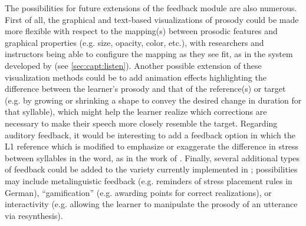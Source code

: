 	The possibilities for future extensions of the feedback module are also numerous. First of all, the graphical and text-based visualizations of prosody could be made more flexible with respect to the mapping(s) between prosodic features and graphical properties (e.g. size, opacity, color, etc.), with researchers and instructors being able to configure the mapping as they see fit, as in the system developed by \textcite{Sitaram2011} (see \cref{sec:capt:listen}). Another possible extension of these visualization methods could be to add animation effects highlighting the difference between the learner's prosody and that of the reference(s) or target (e.g. by growing or shrinking a shape to convey the desired change in duration for that syllable), which might help the learner realize which corrections are necessary to make their speech more closely resemble the target. 
	Regarding auditory feedback, it would be interesting to add a feedback option in which the L1 reference which is modified to emphasize or exaggerate the difference in stress between syllables in the word, as in the work of \citep{Bissiri2006,Bissiri2009}.
	Finally, several additional types of feedback could be added to the variety currently implemented in ; possibilities may include metalinguistic feedback (e.g. reminders of stress placement rules in German), ``gamification'' (e.g. awarding points for correct realizations), or interactivity (e.g. allowing the learner to manipulate the prosody of an utterance via resynthesis). 


	
	
	
